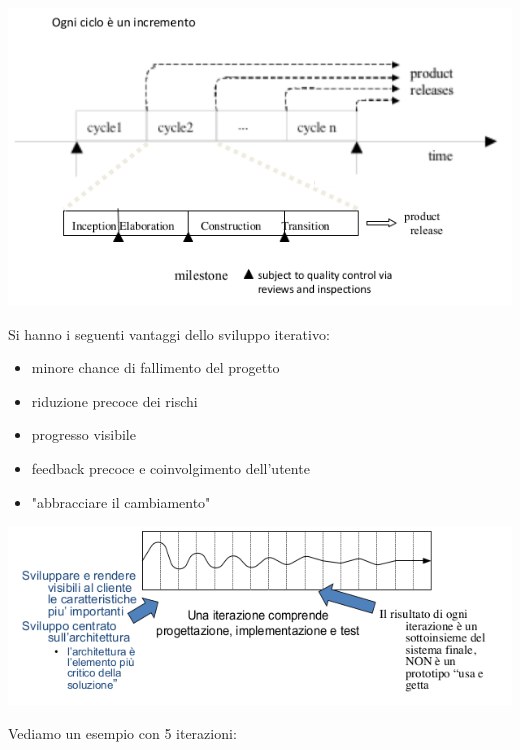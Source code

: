 \documentclass[a4paper,12pt, oneside]{book}
\begin{document}
\begin{center}
	\includegraphics[scale=0.7]{img/ms5.png}
\end{center}
Si hanno i seguenti vantaggi dello sviluppo iterativo:
\begin{itemize}
	\item minore chance di fallimento del progetto
	\item riduzione precoce dei rischi
	\item progresso visibile
	\item feedback precoce e coinvolgimento dell'utente
	\item "abbracciare il cambiamento"
\end{itemize}
\begin{center}
	\includegraphics[scale=0.7]{img/ms6.png}
\end{center}
Vediamo un esempio con 5 iterazioni:
\end{document}

